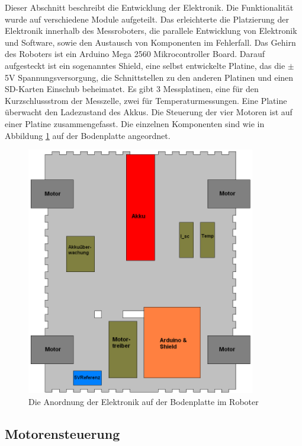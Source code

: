\documentclass[a4paper,bibtotoc,oneside]{scrbook}
\begin{document}
Dieser Abschnitt beschreibt die Entwicklung der Elektronik. Die Funktionalität wurde auf verschiedene Module aufgeteilt. Das erleichterte die Platzierung der Elektronik innerhalb des Messroboters, die parallele Entwicklung von Elektronik und Software, sowie den Austausch von Komponenten im Fehlerfall. 
Das Gehirn des Roboters ist ein Arduino Mega 2560 Mikrocontroller Board. Darauf aufgesteckt ist ein sogenanntes Shield, eine selbst entwickelte Platine, das die $\pm$5V Spannungsversorgung, die Schnittstellen zu den anderen Platinen und einen SD-Karten Einschub beheimatet.
Es gibt 3 Messplatinen, eine für den Kurzschlussstrom der Messzelle, zwei für Temperaturmessungen. Eine Platine überwacht den Ladezustand des Akkus. Die Steuerung der vier Motoren ist auf einer Platine zusammengefasst.
Die einzelnen Komponenten sind wie in Abbildung \ref{elek} auf der Bodenplatte angeordnet.
\begin{figure}[htbp]
\centering
\includegraphics[width=100mm]{img/bodenplatte.png}
\caption{Die Anordnung der Elektronik auf der Bodenplatte im Roboter}\label{elek}
\end{figure}
 
\subsection{Motorensteuerung}\thispagestyle{empty}
\end{document}
